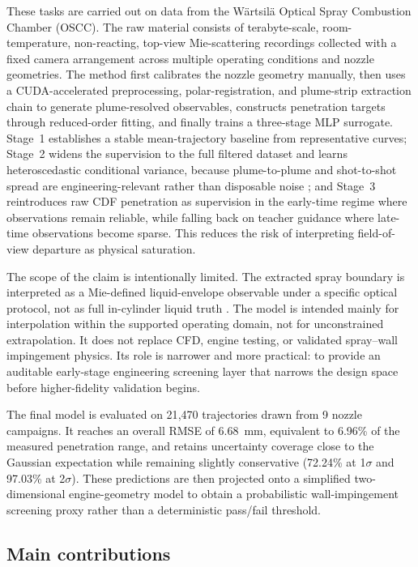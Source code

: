 \documentclass[english, 12pt, a4paper, elec, utf8, a-2b, online]{aaltothesis}
\begin{document}
These tasks are carried out on data from the W\"artsil\"a Optical Spray Combustion Chamber (OSCC).
The raw material consists of terabyte-scale, room-temperature, non-reacting, top-view Mie-scattering recordings 
collected with a fixed camera arrangement across multiple operating conditions and nozzle geometries.
The method first calibrates the nozzle geometry manually, then uses a CUDA-accelerated preprocessing, polar-registration, 
and plume-strip extraction chain to generate plume-resolved observables, 
constructs penetration targets through reduced-order fitting, and finally trains a three-stage MLP surrogate.
Stage~1 establishes a stable mean-trajectory baseline from representative curves; 
Stage~2 widens the supervision to the full filtered dataset and learns heteroscedastic conditional variance, 
because plume-to-plume and shot-to-shot spread are engineering-relevant rather than disposable noise \cite{KendallGal2017}; 
and Stage~3 reintroduces raw CDF penetration as supervision in the early-time regime where observations remain reliable, 
while falling back on teacher guidance where late-time observations become sparse. 
This reduces the risk of interpreting field-of-view departure as physical saturation.

The scope of the claim is intentionally limited.
The extracted spray boundary is interpreted as a Mie-defined liquid-envelope observable under a specific optical protocol, 
not as full in-cylinder liquid truth \cite{ecn_liquid_penetration,ecn_liquid_penetration_accessory}.
The model is intended mainly for interpolation within the supported operating domain, not for unconstrained extrapolation.
It does not replace CFD, engine testing, or validated spray--wall impingement physics. 
Its role is narrower and more practical: to provide an auditable early-stage engineering screening layer 
that narrows the design space before higher-fidelity validation begins.

The final model is evaluated on 21{,}470 trajectories drawn from 9 nozzle campaigns.
It reaches an overall RMSE of \SI{6.68}{mm}, equivalent to 6.96\% of the measured penetration range,
and retains uncertainty coverage close to the Gaussian expectation while remaining slightly conservative 
(72.24\% at 1$\sigma$ and 97.03\% at 2$\sigma$).
These predictions are then projected onto a simplified two-dimensional engine-geometry model 
to obtain a probabilistic wall-impingement screening proxy rather than a deterministic pass/fail threshold.

\subsection{Main contributions}
\end{document}
